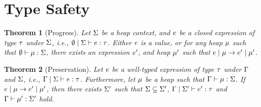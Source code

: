 \documentclass[10pt]{scrartcl}
\newtheorem{theorem}{Theorem}
\begin{document}
\section{Type Safety}
\label{sec:safety}

\begin{theorem}[Progress]
  Let $\Sigma$ be a heap context, and $e$ be a closed expression of type $\tau$ under $\Sigma$, i.e., $\emptyset\;|\;\Sigma \vdash{} e : \tau$. Either $e$ is a value, or for any heap $\mu$ such that $\emptyset \vdash{} \mu : \Sigma$, there exists an expression $e'$, and heap $\mu'$ such that $e\;|\;\mu \to e'\;|\;\mu'$.
\end{theorem}

\begin{theorem}[Preservation]
  Let $e$ be a well-typed expression of type $\tau$ under $\Gamma$ and $\Sigma$, i.e., $\Gamma\;|\;\Sigma \vdash{} e : \tau$. Furthermore, let $\mu$ be a heap such that $\Gamma \vdash{} \mu : \Sigma$. If $e\;|\;\mu \to e'\;|\;\mu'$, then there exists $\Sigma'$ such that $\Sigma \subseteq \Sigma'$, $\Gamma\;|\;\Sigma' \vdash{} e' : \tau$ and $\Gamma \vdash{} \mu' : \Sigma'$ hold.
\end{theorem}
\end{document}
